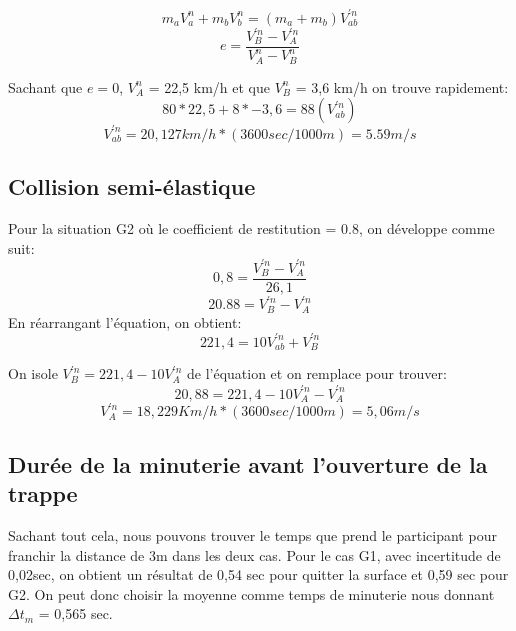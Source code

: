 \documentclass{article}
\begin{document}
\begin{equation}
	m_{a}V_{a}^{n} + m_{b}V_{b}^{n} =( m_{a} + m_{b})V_{ab}^{'n} 
\end{equation}
\begin{equation}
	e = \frac {V_{B}^{'n}-V_{A}^{'n}}{V_{A}^{n}-V_{B}^{n}} 
\end{equation}  

Sachant que $ e = 0$, $ V_{A}^{n}$ = 22,5 km/h et que  $V_{B}^{n}$ = 3,6 km/h on trouve rapidement:
\begin{equation}
	80*22,5 +8*-3,6 = 88(V_{ab}^{'n})
\end{equation}  
\begin{equation}
V_{ab}^{'n} = 20,127 km/h * (3600sec/1000m) = 5.59 m/s
\end{equation}

\subsection{Collision semi-élastique}
Pour la situation G2 où le coefficient de restitution = 0.8, on développe comme suit:
\begin{equation}
	0,8 = \frac{V_{B}^{'n}-V_{A}^{'n}}{26,1}
\end{equation} 
\begin{equation}
	20.88 = V_{B}^{'n}-V_{A}^{'n} 
\end{equation} 
En réarrangant l'équation, on obtient:
\begin{equation}
	221,4 = 10V_{ab}^{'n}+V_{B}^{'n}
\end{equation} 

On isole  $V_{B}^{'n} = 221,4 - 10V_{A}^{'n}$ de l'équation et on remplace pour trouver:
\begin{equation}
	20,88 = {221,4 - 10V_{A}^{'n}-V_{A}^{'n}}
\end{equation}
\begin{equation}
	V_{A}^{'n} = 18,229 Km/h *(3600sec/1000m) = 5,06 m/s
\end{equation}

\subsection{Durée de la minuterie avant l'ouverture de la trappe}
Sachant tout cela, nous pouvons trouver le temps que prend le participant pour franchir la distance de 3m dans les deux cas. Pour le cas G1, avec incertitude de 0,02sec, on obtient un résultat de 0,54 sec pour quitter la surface et 0,59 sec pour G2. On peut donc choisir la moyenne comme temps de minuterie nous donnant  $\Delta t_{m}$ = 0,565 sec.
\end{document}

